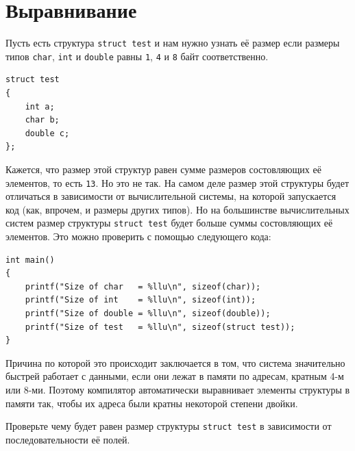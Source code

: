 \documentclass{article}
\begin{document}
\newpage
\section*{Выравнивание}
Пусть есть структура \texttt{struct test} и нам нужно узнать её размер если размеры типов \texttt{char}, \texttt{int} и \texttt{double} равны \texttt{1}, \texttt{4} и \texttt{8} байт соответственно.
\begin{lstlisting}
struct test 
{
    int a;
    char b;
    double c;
};
\end{lstlisting}
Кажется, что размер этой структур равен сумме размеров состовляющих её элементов, то есть \texttt{13}. Но это не так. 
На самом деле размер этой структуры будет отличаться в зависимости от вычислительной системы, на которой запускается код (как, впрочем, и размеры других типов). Но на большинстве вычислительных систем размер структуры \texttt{struct test} будет больше суммы состовляющих её элементов. Это можно проверить с помощью следующего кода:


\begin{lstlisting}
int main() 
{
    printf("Size of char   = %llu\n", sizeof(char));
    printf("Size of int    = %llu\n", sizeof(int));
    printf("Size of double = %llu\n", sizeof(double));
    printf("Size of test   = %llu\n", sizeof(struct test));
}
\end{lstlisting}

Причина по которой это происходит заключается в том, что система значительно быстрей работает с данными, если они лежат в памяти по адресам, кратным 4-м или 8-ми. Поэтому компилятор автоматически выравнивает элементы структуры в памяти так, чтобы их адреса были кратны некоторой степени двойки.

Проверьте чему будет равен размер структуры \texttt{struct test} в зависимости от последовательности её полей.
\end{document}
